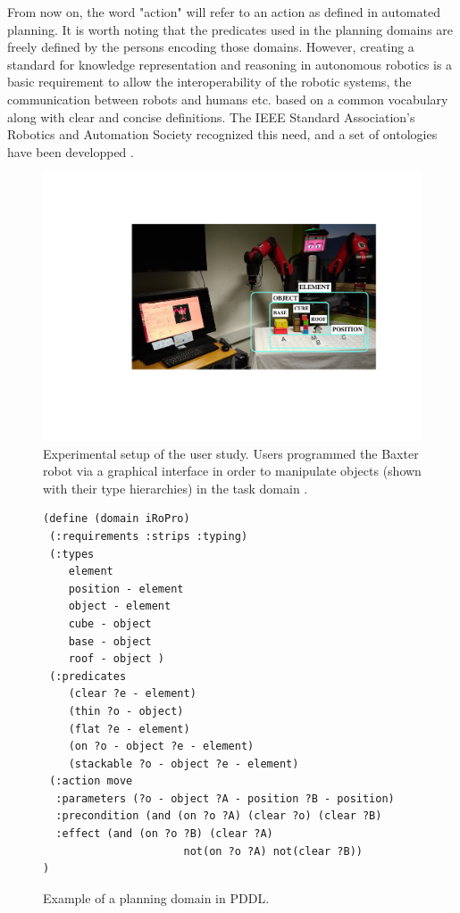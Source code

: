 From now on, the word "action" will refer to an action as defined in automated planning. It is worth noting that the predicates used in the planning domains are freely defined by the persons encoding those domains. However, creating a standard for knowledge representation and reasoning in autonomous robotics is a basic requirement to allow the interoperability of the robotic systems, the communication between robots and humans etc. based on a common vocabulary along with clear and concise definitions. The IEEE Standard Association's Robotics and Automation Society recognized this need, and a set of ontologies have been developped \cite{8172300}.
\begin{figure}
	\centering
	\includegraphics[width=\linewidth]{Fig3.pdf}
	\caption{Experimental setup of the user study. Users programmed the Baxter robot via a graphical interface in order to manipulate objects (shown with their type hierarchies) in the task domain \cite{liang2019d}. } 
	\label{fig:dispositif}
\end{figure}

\begin{figure}
\begin{verbatim}
(define (domain iRoPro)
 (:requirements :strips :typing)
 (:types 
    element  
    position - element  
    object - element 
    cube - object 
    base - object 
    roof - object )
 (:predicates
    (clear ?e - element)
    (thin ?o - object)
    (flat ?e - element)
    (on ?o - object ?e - element)
    (stackable ?o - object ?e - element) 
 (:action move
  :parameters (?o - object ?A - position ?B - position)
  :precondition (and (on ?o ?A) (clear ?o) (clear ?B)
  :effect (and (on ?o ?B) (clear ?A)
                      not(on ?o ?A) not(clear ?B))
)
\end{verbatim}
    \caption{Example of a planning domain in PDDL.}
	\label{fig:pddl}
\end{figure}

